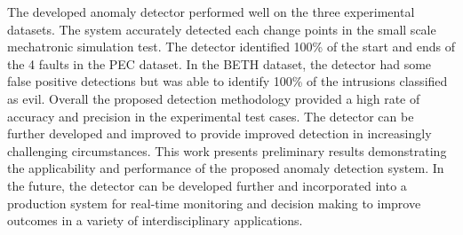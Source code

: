 The developed anomaly detector performed well on the three experimental datasets. The system accurately detected each change points in the small scale mechatronic simulation test. The detector identified 100\% of the start and ends of the 4 faults in the PEC dataset. In the BETH dataset, the detector had some false positive detections but was able to identify 100\% of the intrusions classified as evil. Overall the proposed detection methodology provided a high rate of accuracy and precision in the experimental test cases. The detector can be further developed and improved to provide improved detection in increasingly challenging circumstances. This work presents preliminary results demonstrating the applicability and performance of the proposed anomaly detection system. In the future, the detector can be developed further and incorporated into a production system for real-time monitoring and decision making to improve outcomes in a variety of interdisciplinary applications. 